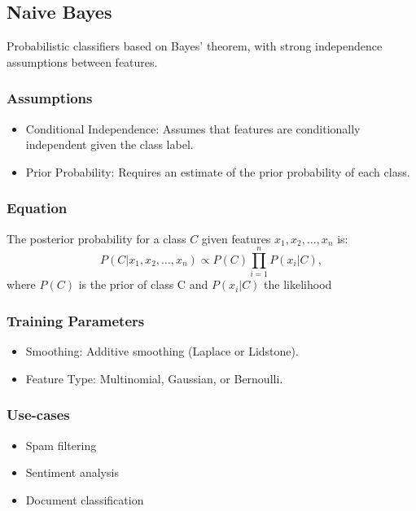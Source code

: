 \documentclass[english]{latex4ei/latex4ei_sheet}
\begin{document}
\begin{sectionbox}
\subsection{Naive Bayes}

Probabilistic classifiers based on Bayes' theorem, with strong independence assumptions between features.

\subsubsection{Assumptions}
\begin{itemize}
    \item Conditional Independence: Assumes that features are conditionally independent given the class label.
    \item Prior Probability: Requires an estimate of the prior probability of each class.
\end{itemize}

\subsubsection{Equation}
The posterior probability for a class \( C \) given features \( x_1, x_2, \ldots, x_n \) is:
\[
P(C|x_1, x_2, \ldots, x_n) \propto P(C) \prod_{i=1}^{n} P(x_i|C), 
\]
where $P(C)$ is the prior of class C and $P(x_i|C)$ the likelihood

\subsubsection{Training Parameters}
\begin{itemize}
    \item Smoothing: Additive smoothing (Laplace or Lidstone).
    \item Feature Type: Multinomial, Gaussian, or Bernoulli.
\end{itemize}

\subsubsection{Use-cases}
\begin{itemize}
    \item Spam filtering
    \item Sentiment analysis
    \item Document classification
\end{itemize}


\end{sectionbox}
\end{document}
